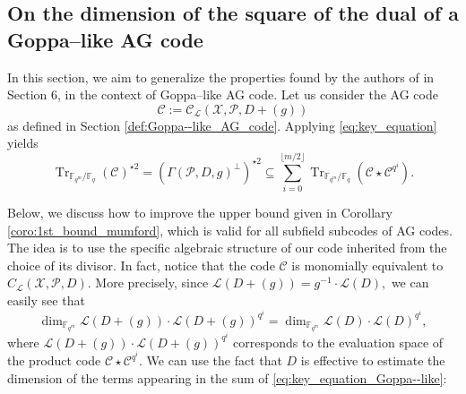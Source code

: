 \documentclass[a4paper]{article}
\theoremstyle{definition}
\theoremstyle{remark}
\newcommand{\calP}{\mathcal{P}}
\newcommand{\calL}{\mathcal{L}}
\newcommand{\calC}{\mathcal{C}}
\newcommand{\calX}{\mathcal{X}}
\newcommand{\fqm}{\mathbb{F}_{q^m}}
\newcommand{\fq}{\mathbb{F}_{q}}
\newcommand{\Tr}[1]{\operatorname{Tr}_{\mathbb{F}_{q^m}/\fq}\left(#1\right)}
\begin{document}
\subsection{On the dimension of the square of the dual of a Goppa--like AG code} \label{section:1st_improvement}
In this section, we aim to generalize the properties found by the authors of \cite{MT21} in Section 6, in the context of Goppa--like AG code. Let us consider the AG code 
$$\calC := \calC_{\calL}(\calX,\calP,D+(g))$$
as defined in Section \ref{def:Goppa--like_AG_code}. Applying \eqref{eq:key_equation} yields   
\begin{equation} \label{eq:key_equation_Goppa--like} 
\Tr{\calC}^{\star 2} = (\Gamma(\calP,D,g)^{\perp})^{\star2} \subseteq \sum\limits_{i=0}^{\lfloor{m/2} \rfloor} \Tr{\calC\star \calC^{q^i}}.
\end{equation}

Below, we discuss how to improve the upper bound given in Corollary \ref{coro:1st_bound_mumford}, which is valid for all subfield subcodes of AG codes. The idea is to use the specific algebraic structure of our code inherited from the choice of its divisor.
\noindent In fact, notice that the code $\calC$ is monomially equivalent to $C_{\calL}(\calX,\calP,D)$. 
More precisely, since $\calL(D+(g)) = g^{-1} \cdot \calL(D),$
we can easily see that
\begin{equation} \label{eq:equiv_divisors}
\dim_{\fqm} \calL(D+(g))\cdot \calL(D+(g))^{q^i} = \dim_{\fqm} \calL(D)\cdot \calL(D)^{q^i},
\end{equation}
where $\calL(D+(g))\cdot \calL(D+(g))^{q^i}$ corresponds to the evaluation space of the product code $\calC \star \calC^{q^i}$. We can use the fact that $D$ is effective to estimate the dimension of the terms appearing in the sum of \eqref{eq:key_equation_Goppa--like}:
\end{document}
